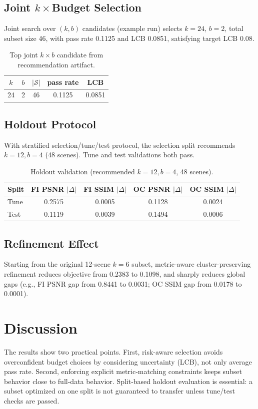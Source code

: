 \documentclass[10pt,twocolumn,letterpaper]{article}
\begin{document}
\subsection{Joint \texorpdfstring{\(k\times\)}{k x}Budget Selection}
Joint search over \((k,b)\) candidates (example run) selects \(k=24\), \(b=2\), total subset size 46, with pass rate 0.1125 and LCB 0.0851, satisfying target LCB 0.08.

\begin{table}[t]
\centering
\caption{Top joint \(k\times b\) candidate from recommendation artifact.}
\label{tab:joint_reco}
\begin{tabular}{ccccc}
\toprule
\(k\) & \(b\) & \(|\mathcal S|\) & pass rate & LCB \\
\midrule
24 & 2 & 46 & 0.1125 & 0.0851 \\
\bottomrule
\end{tabular}
\end{table}

\subsection{Holdout Protocol}
With stratified selection/tune/test protocol, the selection split recommends \(k=12, b=4\) (48 scenes). Tune and test validations both pass.

\begin{table}[t]
\centering
\caption{Holdout validation (recommended \(k=12,b=4\), 48 scenes).}
\label{tab:holdout}
\begin{tabular}{lcccc}
\toprule
Split & FI PSNR \(|\Delta|\) & FI SSIM \(|\Delta|\) & OC PSNR \(|\Delta|\) & OC SSIM \(|\Delta|\) \\
\midrule
Tune & 0.2575 & 0.0005 & 0.1128 & 0.0024 \\
Test & 0.1119 & 0.0039 & 0.1494 & 0.0006 \\
\bottomrule
\end{tabular}
\end{table}

\subsection{Refinement Effect}
Starting from the original 12-scene \(k=6\) subset, metric-aware cluster-preserving refinement reduces objective from 0.2383 to 0.1098, and sharply reduces global gaps (e.g., FI PSNR gap from 0.8441 to 0.0031; OC SSIM gap from 0.0178 to 0.0001).

\section{Discussion}
The results show two practical points. First, risk-aware selection avoids overconfident budget choices by considering uncertainty (LCB), not only average pass rate. Second, enforcing explicit metric-matching constraints keeps subset behavior close to full-data behavior. Split-based holdout evaluation is essential: a subset optimized on one split is not guaranteed to transfer unless tune/test checks are passed.
\end{document}
